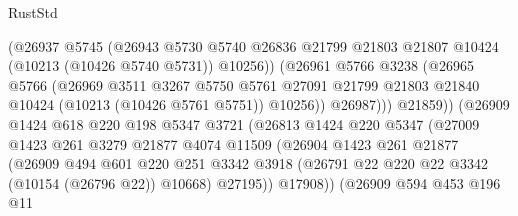 \begin{lexlean}{RustStd}
\begin{coremodule}
{\begin{coremodule}
{{{{{{{{{{{{{{{{{{{{{{{{{{                              (@26937
                                @5745
                                (@26943
                                  @5730
                                  @5740
                                  @26836
                                  @21799
                                  @21803
                                  @21807
                                  @10424
                                  (@10213 (@10426 @5740 @5731))
                                  @10256))
                              (@26961
                                @5766
                                @3238
                                (@26965
                                  @5766
                                  (@26969
                                    @3511
                                    @3267
                                    @5750
                                    @5761
                                    @27091
                                    @21799
                                    @21803
                                    @21840
                                    @10424
                                    (@10213 (@10426 @5761 @5751))
                                    @10256))
                                @26987)))
                          @21859))
                      (@26909
                        @1424
                        @618
                        @220
                        @198
                        @5347
                        @3721
                        (@26813
                          @1424
                          @220
                          @5347
                          (@27009
                            @1423
                            @261
                            @3279
                            @21877
                            @4074
                            @11509
                            (@26904
                              @1423
                              @261
                              @21877
                              (@26909
                                @494
                                @601
                                @220
                                @251
                                @3342
                                @3918
                                (@26791 @22 @220 @22 @3342 (@10154 (@26796 @22)) @10668)
                                @27195))
                            @17908))
                        (@26909
                          @594
                          @453
                          @196
                          @11
}}}}}}}}}}}}}}}}}}}}}}}}}}
\end{coremodule}}
\end{coremodule}
\end{lexlean}

